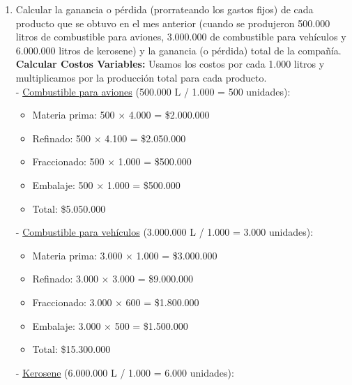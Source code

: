 \documentclass[10pt,a4paper]{article}
\begin{document}
\begin{enumerate}
    \item Calcular la ganancia o pérdida (prorrateando los gastos fijos) de cada producto que se obtuvo en el mes
    anterior (cuando se produjeron 500.000 litros de combustible para aviones, 3.000.000 de combustible para
    vehículos y 6.000.000 litros de kerosene) y la ganancia (o pérdida) total de la compañía. \\

    \textbf{Calcular Costos Variables:} Usamos los costos por cada 1.000 litros y multiplicamos por la producción total para cada producto. \\

    - \underline{Combustible para aviones} (500.000 L / 1.000 = 500 unidades):

    \begin{itemize}

        \item Materia prima: 500 × 4.000 = \$2.000.000
        \item Refinado: 500 × 4.100 = \$2.050.000
        \item Fraccionado: 500 × 1.000 = \$500.000
        \item Embalaje: 500 × 1.000 = \$500.000 \\
        \item Total: \$5.050.000

    \end{itemize}

    - \underline{Combustible para vehículos} (3.000.000 L / 1.000 = 3.000 unidades):

    \begin{itemize}

        \item Materia prima: 3.000 × 1.000 = \$3.000.000
        \item Refinado: 3.000 × 3.000 = \$9.000.000
        \item Fraccionado: 3.000 × 600 = \$1.800.000
        \item Embalaje: 3.000 × 500 = \$1.500.000 \\
        \item Total: \$15.300.000

    \end{itemize}

    - \underline{Kerosene} (6.000.000 L / 1.000 = 6.000 unidades):

    \begin{itemize}


\end{itemize}
\end{enumerate}
\end{document}
